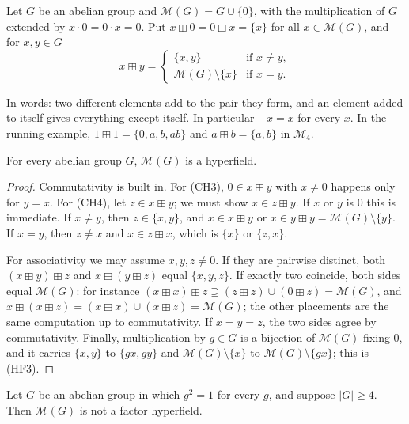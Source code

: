\documentclass[11pt]{amsart}
\numberwithin{equation}{section}
\newcommand{\hplus}{\boxplus}
\newcommand{\Mas}{\mathcal M}
\begin{document}
\begin{definition}\label{def:massouros}
Let $G$ be an abelian group and $\Mas(G)=G\cup\{0\}$, with the multiplication of $G$ extended by $x\cdot0=0\cdot x=0$. Put $x\hplus 0=0\hplus x=\{x\}$ for all $x\in\Mas(G)$, and for $x,y\in G$
\[
  x\hplus y=\begin{cases}\{x,y\} & \text{if } x\ne y,\\ \Mas(G)\setminus\{x\} & \text{if } x=y.\end{cases}
\]
\end{definition}

In words: two different elements add to the pair they form, and an element added to itself gives everything except itself. In particular $-x=x$ for every $x$. In the running example, $1\hplus1=\{0,a,b,ab\}$ and $a\hplus b=\{a,b\}$ in $\Mas_4$.

\begin{lemma}\label{lem:massouros-hf}
For every abelian group $G$, $\Mas(G)$ is a hyperfield.
\end{lemma}

\begin{proof}
Commutativity is built in. For (CH3), $0\in x\hplus y$ with $x\ne0$ happens only for $y=x$. For (CH4), let $z\in x\hplus y$; we must show $x\in z\hplus y$. If $x$ or $y$ is $0$ this is immediate. If $x\ne y$, then $z\in\{x,y\}$, and $x\in x\hplus y$ or $x\in y\hplus y=\Mas(G)\setminus\{y\}$. If $x=y$, then $z\ne x$ and $x\in z\hplus x$, which is $\{x\}$ or $\{z,x\}$.

For associativity we may assume $x,y,z\ne0$. If they are pairwise distinct, both $(x\hplus y)\hplus z$ and $x\hplus(y\hplus z)$ equal $\{x,y,z\}$. If exactly two coincide, both sides equal $\Mas(G)$: for instance $(x\hplus x)\hplus z\supseteq (z\hplus z)\cup(0\hplus z)=\Mas(G)$, and $x\hplus(x\hplus z)=(x\hplus x)\cup(x\hplus z)=\Mas(G)$; the other placements are the same computation up to commutativity. If $x=y=z$, the two sides agree by commutativity. Finally, multiplication by $g\in G$ is a bijection of $\Mas(G)$ fixing $0$, and it carries $\{x,y\}$ to $\{gx,gy\}$ and $\Mas(G)\setminus\{x\}$ to $\Mas(G)\setminus\{gx\}$; this is (HF3).
\end{proof}

\begin{proposition}\label{prop:massouros-not-factor}
Let $G$ be an abelian group in which $g^2=1$ for every $g$, and suppose $|G|\ge4$. Then $\Mas(G)$ is not a factor hyperfield.
\end{proposition}
\end{document}
